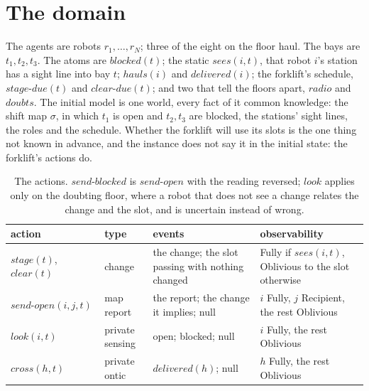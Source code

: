 \documentclass[11pt,a4paper]{article}
\theoremstyle{definition}
\newcommand{\blocked}{\mathit{blocked}}
\newcommand{\sees}{\mathit{sees}}
\newcommand{\shift}{\sigma}
\begin{document}
\section{The domain}
\label{sec:domain}

The agents are robots $r_1, \dots, r_N$; three of the eight on the floor haul.
The bays are $t_1, t_2, t_3$. The atoms are $\blocked(t)$; the static
$\sees(i,t)$, that robot $i$'s station has a sight line into bay $t$;
$\mathit{hauls}(i)$ and $\mathit{delivered}(i)$; the forklift's schedule,
$\mathit{stage\text{-}due}(t)$ and $\mathit{clear\text{-}due}(t)$; and two that
tell the floors apart, $\mathit{radio}$ and $\mathit{doubts}$. The initial model
is one world, every fact of it common knowledge: the shift map
$\shift$, in which $t_1$ is open and $t_2, t_3$ are blocked, the stations' sight
lines, the roles and the schedule. Whether the forklift will use its slots is the
one thing not known in advance, and the instance does not say it in the initial
state: the forklift's actions do.

\begin{table}[H]
\centering\small
\begin{tabularx}{\textwidth}{@{}l l X X@{}}
\toprule
action & type & events & observability \\
\midrule
$\mathit{stage}(t)$, $\mathit{clear}(t)$ & change & the change; the slot passing with nothing changed & Fully if $\sees(i,t)$, Oblivious to the slot otherwise \\
$\mathit{send\text{-}open}(i,j,t)$ & map report & the report; the change it implies; null & $i$ Fully, $j$ Recipient, the rest Oblivious \\
$\mathit{look}(i,t)$ & private sensing & open; blocked; null & $i$ Fully, the rest Oblivious \\
$\mathit{cross}(h,t)$ & private ontic & $\mathit{delivered}(h)$; null & $h$ Fully, the rest Oblivious \\
\bottomrule
\end{tabularx}
\caption{The actions. $\mathit{send\text{-}blocked}$ is $\mathit{send\text{-}open}$
with the reading reversed; $\mathit{look}$ applies only on the doubting floor,
where a robot that does not see a change relates the change and the slot, and is
uncertain instead of wrong.}
\label{tab:actions}
\end{table}
\end{document}
